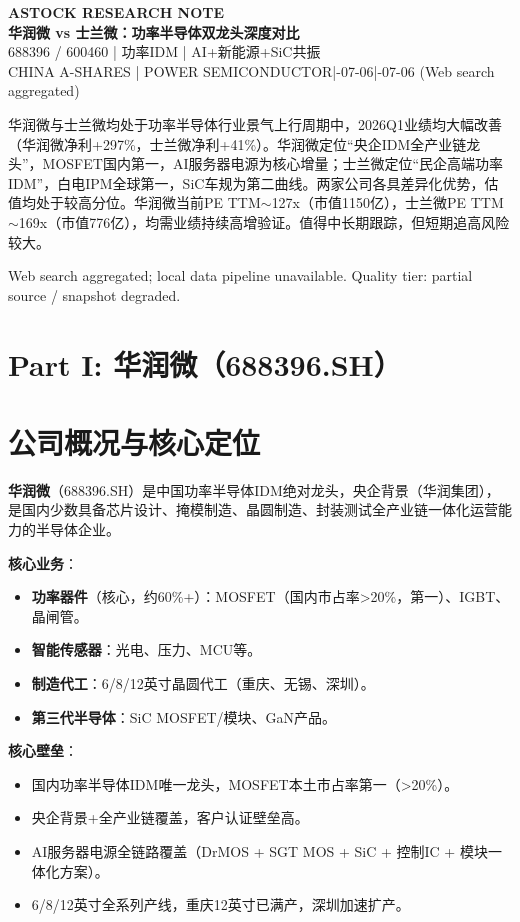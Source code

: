 \documentclass[a4paper,11pt,fontset=none]{ctexart}
\newcommand{\reporttitle}{华润微 vs 士兰微：功率半导体双龙头深度对比}
\newcommand{\reportsubtitle}{688396 / 600460 | 功率IDM | AI+新能源+SiC共振}
\newcommand{\reportkicker}{ASTOCK RESEARCH NOTE}
\newcommand{\reportscope}{CHINA A-SHARES | POWER SEMICONDUCTOR}
\newcommand{\reportdate}{2026-07-06}
\newcommand{\reportdatacutoff}{2026-07-06 (Web search aggregated)}
\newcommand{\reporthouseview}{%
华润微与士兰微均处于功率半导体行业景气上行周期中，2026Q1业绩均大幅改善（华润微净利+297\%，士兰微净利+41\%）。华润微定位``央企IDM全产业链龙头''，MOSFET国内第一，AI服务器电源为核心增量；士兰微定位``民企高端功率IDM''，白电IPM全球第一，SiC车规为第二曲线。两家公司各具差异化优势，估值均处于较高分位。华润微当前PE TTM$\sim$127x（市值1150亿），士兰微PE TTM$\sim$169x（市值776亿），均需业绩持续高增验证。值得中长期跟踪，但短期追高风险较大。%
}
\newcommand{\reportquality}{Web search aggregated; local data pipeline unavailable. Quality tier: partial source / snapshot degraded.}
\begin{document}
\begin{center}
{\sffamily\small\bfseries\color{steelgrey} \reportkicker}\\[3pt]
{\LARGE\bfseries\color{navy} \reporttitle}\\[5pt]
{\large\color{steelgrey} \reportsubtitle}\\[4pt]
{\small\color{mutedgrey} \reportscope \quad|\quad \reportdate \quad|\quad \reportdatacutoff}
\end{center}
\vspace{0.7em}

\begin{dashboardbox}
\begin{houseviewbox}
\reporthouseview
\end{houseviewbox}
\begin{sourcequalitybox}
\reportquality
\end{sourcequalitybox}
\end{dashboardbox}

\newpage
\section*{\color{navy}\large Part I: 华润微（688396.SH）}

\section{公司概况与核心定位}

\textbf{华润微}（688396.SH）是中国功率半导体IDM绝对龙头，央企背景（华润集团），是国内少数具备芯片设计、掩模制造、晶圆制造、封装测试全产业链一体化运营能力的半导体企业。

\textbf{核心业务}：
\begin{itemize}
  \item \textbf{功率器件}（核心，约60\%+）：MOSFET（国内市占率>20\%，第一）、IGBT、晶闸管。
  \item \textbf{智能传感器}：光电、压力、MCU等。
  \item \textbf{制造代工}：6/8/12英寸晶圆代工（重庆、无锡、深圳）。
  \item \textbf{第三代半导体}：SiC MOSFET/模块、GaN产品。
\end{itemize}

\textbf{核心壁垒}：
\begin{itemize}
  \item 国内功率半导体IDM唯一龙头，MOSFET本土市占率第一（>20\%）。
  \item 央企背景+全产业链覆盖，客户认证壁垒高。
  \item AI服务器电源全链路覆盖（DrMOS + SGT MOS + SiC + 控制IC + 模块一体化方案）。
  \item 6/8/12英寸全系列产线，重庆12英寸已满产，深圳加速扩产。
\end{itemize}
\end{document}
